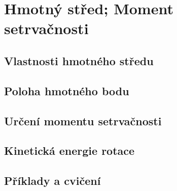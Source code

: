 \chapter{Hmotný střed; Moment setrvačnosti}\label{fyz:IchapXIX}
\minitoc
  \section{Vlastnosti hmotného středu}\label{fyz:IchapXIXsecI}
  \section{Poloha hmotného bodu}\label{fyz:IchapXIXsecII}
  \section{Určení momentu setrvačnosti}\label{fyz:IchapXIXsecIII}
  \section{Kinetická energie rotace}\label{fyz:IchapXIXsecIV}
  \section{Příklady a cvičení}\label{fyz:IchapXIXsecV}